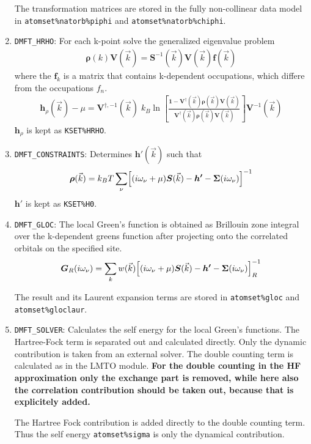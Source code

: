 \documentclass[11pt,a4paper]{report}
\newcommand{\mat}[1]{\bm{#1}}  %
\begin{document}
\begin{enumerate}
The transformation matrices are stored in the fully non-collinear data
model in \verb|atomset%natorb%piphi| and \verb|atomset%natorb%chiphi|.
%
\item \verb|DMFT_HRHO|: For each k-point solve the generalized
  eigenvalue problem
\begin{eqnarray*}
\mat{\rho}(k)\mat{V}(\vec{k})=
\mat{S}^{-1}(\vec{k})\mat{V}(\vec{k})\mat{f}(\vec{k})
\end{eqnarray*}
where the $\mat{f}_k$ is a matrix that contains k-dependent
occupations, which differe from the occupations $f_n$.
\begin{eqnarray}
\mat{h}_\rho(\vec{k})-\mu=\mat{V}^{\dagger,-1}(\vec{k})\; k_B
\ln\left[
\frac{\mat{1}-\mat{V}^\dagger(\vec{k})\mat{\rho}(\vec{k})\mat{V}(\vec{k})}
{\mat{V}^\dagger(\vec{k})\mat{\rho}(\vec{k})\mat{V}(\vec{k})}
\right]\mat{V}^{-1}(\vec{k})
\end{eqnarray}
$\mat{h}_\rho$ is kept as \verb|KSET%HRHO|.
%
\item \verb|DMFT_CONSTRAINTS|: Determines $\mat{h}'(\vec{k})$ such that
\begin{eqnarray}
\mat{\rho}(\vec{k})=k_BT\sum_\nu \Bigl[(i\omega_\nu+\mu)\mat{S}(\vec{k})-
\mat{h'}-\mat{\Sigma}(i\omega_\nu)\Bigr]^{-1}
\end{eqnarray}
$\mat{h'}$ is kept as \verb|KSET%H0|.
%
\item \verb|DMFT_GLOC|: The local Green's function is obtained as
  Brillouin zone integral over the k-dependent greens function after
  projecting onto the correlated orbitals on the specified site.
\begin{eqnarray}
\mat{G}_R(i\omega_\nu)=\sum_k w(\vec{k})
\Bigl[(i\omega_\nu+\mu)\mat{S}(\vec{k})-
\mat{h'}-\mat{\Sigma}(i\omega_\nu)\Bigr]^{-1}_R
\end{eqnarray}

The result and its Laurent expansion terms are stored in
\verb|atomset%gloc| and \verb|atomset%gloclaur|.
%
\item \verb|DMFT_SOLVER|: Calculates the self energy for the local
  Green's functions. The Hartree-Fock term is separated out and
  calculated directly. Only the dynamic contribution is taken from an
  external solver. The double counting term is calculated as in the
  LMTO module. \textbf{For the double counting in the HF approximation
    only the exchange part is removed, while here also the correlation
    contribution should be taken out, because that is explicitely
    added.}

  The Hartree Fock contribution is added directly to the double
  counting term. Thus the self energy \verb|atomset%sigma| is only
  the dynamical contribution.


\end{enumerate}
\end{document}
